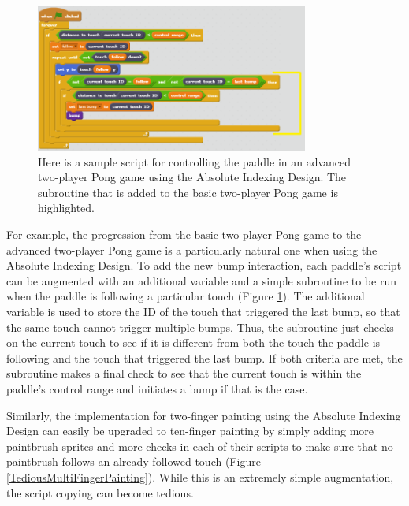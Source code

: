 \begin{figure}
\centering
\includegraphics[width=0.8\textwidth]{images/AdvancedTwoPlayerPongAID.PNG}
\caption[Sample Absolute Indexing Design Script For Advanced Two-Player Pong]{Here is a sample script for controlling the paddle in an advanced two-player Pong game using the Absolute Indexing Design. The subroutine that is added to the basic two-player Pong game is highlighted. }
\label{AdvancedTwoPlayerPongAID}
\end{figure}

For example, the progression from the basic two-player Pong game to the advanced two-player Pong game is a particularly natural one when using the Absolute Indexing Design. To add the new bump interaction, each paddle's script can be augmented with an additional variable and a simple subroutine to be run when the paddle is following a particular touch (Figure \ref{AdvancedTwoPlayerPongAID}). The additional variable is used to store the ID of the touch that triggered the last bump, so that the same touch cannot trigger multiple bumps. Thus, the subroutine just checks on the current touch to see if it is different from both the touch the paddle is following and the touch that triggered the last bump. If both criteria are met, the subroutine makes a final check to see that the current touch is within the paddle's control range and initiates a bump if that is the case.

Similarly, the implementation for two-finger painting using the Absolute Indexing Design can easily be upgraded to ten-finger painting by simply adding more paintbrush sprites and more checks in each of their scripts to make sure that no paintbrush follows an already followed touch (Figure \ref{TediousMultiFingerPainting}). While this is an extremely simple augmentation, the script copying can become tedious. 

